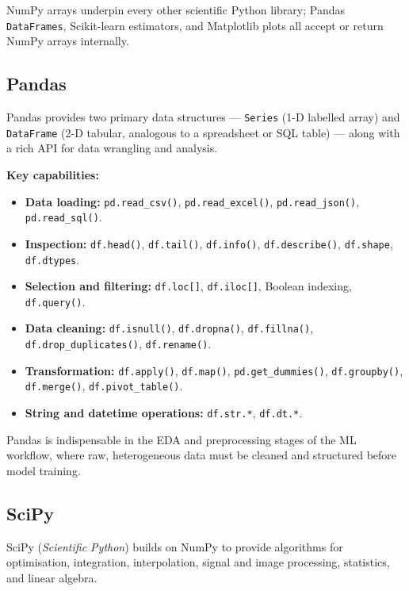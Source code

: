 \documentclass[12pt,a4paper]{article}
\begin{document}
NumPy arrays underpin every other scientific Python library; Pandas \texttt{DataFrames},
Scikit-learn estimators, and Matplotlib plots all accept or return NumPy arrays internally.

\subsection{Pandas}

Pandas provides two primary data structures --- \texttt{Series} (1-D labelled array) and
\texttt{DataFrame} (2-D tabular, analogous to a spreadsheet or SQL table) --- along with
a rich API for data wrangling and analysis.

\textbf{Key capabilities:}
\begin{itemize}[noitemsep]
  \item \textbf{Data loading:} \texttt{pd.read\_csv()}, \texttt{pd.read\_excel()},
        \texttt{pd.read\_json()}, \texttt{pd.read\_sql()}.
  \item \textbf{Inspection:} \texttt{df.head()}, \texttt{df.tail()}, \texttt{df.info()},
        \texttt{df.describe()}, \texttt{df.shape}, \texttt{df.dtypes}.
  \item \textbf{Selection and filtering:} \texttt{df.loc[]}, \texttt{df.iloc[]},
        Boolean indexing, \texttt{df.query()}.
  \item \textbf{Data cleaning:} \texttt{df.isnull()}, \texttt{df.dropna()},
        \texttt{df.fillna()}, \texttt{df.drop\_duplicates()}, \texttt{df.rename()}.
  \item \textbf{Transformation:} \texttt{df.apply()}, \texttt{df.map()},
        \texttt{pd.get\_dummies()}, \texttt{df.groupby()}, \texttt{df.merge()},
        \texttt{df.pivot\_table()}.
  \item \textbf{String and datetime operations:} \texttt{df.str.*}, \texttt{df.dt.*}.
\end{itemize}

Pandas is indispensable in the EDA and preprocessing stages of the ML workflow, where raw,
heterogeneous data must be cleaned and structured before model training.

\subsection{SciPy}

SciPy (\textit{Scientific Python}) builds on NumPy to provide algorithms for optimisation,
integration, interpolation, signal and image processing, statistics, and linear algebra.
\end{document}

